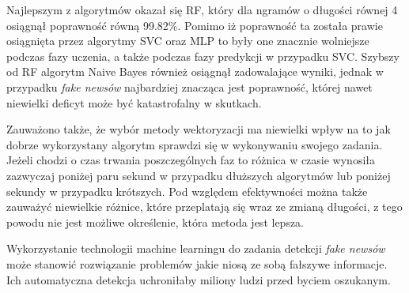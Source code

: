 Najlepszym z algorytmów okazał się RF, który dla ngramów o długości równej 4
osiągnął poprawność równą 99.82\%. Pomimo iż poprawność ta została prawie osiągnięta przez algorytmy
SVC oraz MLP to były one znacznie wolniejsze podczas fazy uczenia, a także podczas fazy 
predykcji w przypadku SVC. Szybszy od RF algorytm Naive Bayes również osiągnął zadowalające wyniki,
jednak w przypadku \textit{fake newsów} najbardziej znacząca jest poprawność, której nawet niewielki deficyt
może być katastrofalny w skutkach.  

Zauważono także, że wybór metody wektoryzacji ma niewielki wpływ na to jak dobrze wykorzystany algorytm 
sprawdzi się w wykonywaniu swojego zadania. Jeżeli chodzi o czas trwania poszczególnych faz to 
różnica w czasie wynosiła zazwyczaj poniżej paru sekund w przypadku dłuższych algorytmów lub poniżej 
sekundy w przypadku krótszych. Pod względem efektywności można także zauważyć niewielkie różnice,
które przeplatają się
wraz ze zmianą długości, z tego powodu nie jest możliwe określenie, która metoda jest lepsza.

Wykorzystanie technologii machine learningu do zadania detekcji \textit{fake newsów} 
może stanowić rozwiązanie problemów jakie niosą ze sobą fałszywe informacje. Ich automatyczna 
detekcja uchroniłaby miliony ludzi przed byciem oszukanym. 
